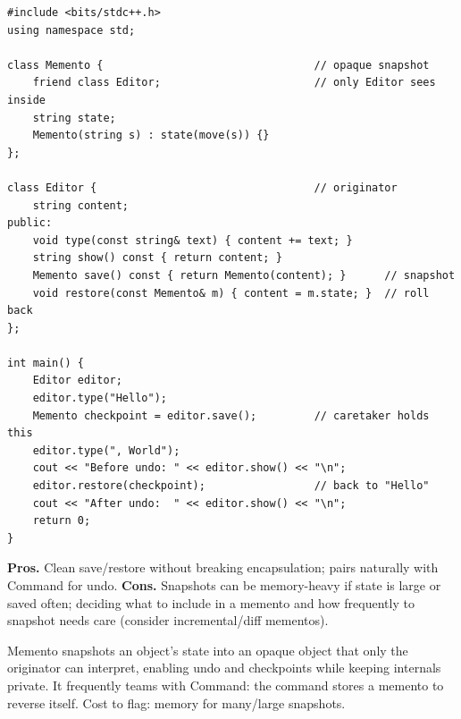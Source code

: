 \begin{lstlisting}
#include <bits/stdc++.h>
using namespace std;

class Memento {                                 // opaque snapshot
    friend class Editor;                        // only Editor sees inside
    string state;
    Memento(string s) : state(move(s)) {}
};

class Editor {                                  // originator
    string content;
public:
    void type(const string& text) { content += text; }
    string show() const { return content; }
    Memento save() const { return Memento(content); }      // snapshot
    void restore(const Memento& m) { content = m.state; }  // roll back
};

int main() {
    Editor editor;
    editor.type("Hello");
    Memento checkpoint = editor.save();         // caretaker holds this
    editor.type(", World");
    cout << "Before undo: " << editor.show() << "\n";
    editor.restore(checkpoint);                 // back to "Hello"
    cout << "After undo:  " << editor.show() << "\n";
    return 0;
}
\end{lstlisting}

\begin{complexitybox}
\textbf{Pros.} Clean save/restore without breaking encapsulation; pairs
naturally with Command for undo. \textbf{Cons.} Snapshots can be
memory-heavy if state is large or saved often; deciding what to include in
a memento and how frequently to snapshot needs care (consider
incremental/diff mementos).
\end{complexitybox}

\begin{takeawaybox}
Memento snapshots an object's state into an opaque object that only the
originator can interpret, enabling undo and checkpoints while keeping
internals private. It frequently teams with Command: the command stores a
memento to reverse itself. Cost to flag: memory for many/large snapshots.
\end{takeawaybox}
